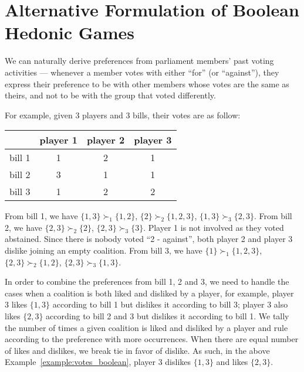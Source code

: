 
\chapter{Alternative Formulation of Boolean Hedonic Games}
\label{append:alternative_boolean}
\vspace*{2em}

We can naturally derive preferences from parliament members' past voting
activities --- whenever a member votes with either ``for'' (or ``against''), they
express their preference to be with other members whose votes are the same
as theirs, and not to be with the group that voted differently.

\begin{example}
\label{example:votes_boolean}
  For example, given 3 players and 3 bills, their votes are as follow:

  \begin{table}[h!]
  \centering
  \begin{tabular}{|c|c|c|c|}
  \hline
         & player 1 & player 2 & player 3 \\ \hline
  bill 1 & 1 & 2 & 1 \\
  bill 2 & 3 & 1 & 1 \\
  bill 3 & 1 & 2 & 2 \\
  \hline
  \end{tabular}
  \end{table}
\end{example}

From bill 1, we have $\{1, 3\} \succ_1 \{1, 2\}$, $\{2\} \succ_2 \{1, 2, 3\}$,
$\{1, 3\} \succ_3 \{2, 3\}$.
From bill 2, we have $\{2, 3\} \succ_2 \{2\}$, $\{2, 3\} \succ_3 \{3\}$.
Player 1 is not involved as they voted abstained.
Since there is nobody voted ``2 - against'', both player 2 and player 3 dislike
joining an empty coalition.
From bill 3, we have $\{1\} \succ_1 \{1, 2, 3\}$, $\{2, 3\} \succ_2 \{1, 2\}$,
$\{2, 3\} \succ_3 \{1, 3\}$.

In order to combine the preferences from bill 1, 2 and 3, we need to handle
the cases when a coalition is both liked and disliked by a player, for example,
player 3 likes $\{1, 3\}$ according to bill 1 but dislikes it according to bill 3;
player 3 also likes $\{2, 3\}$ according to bill 2 and 3 but dislikes it
according to bill 1.
We tally the number of times a given coalition is liked and disliked by a
player and rule according to the preference with more occurrences.
When there are equal number of likes and dislikes, we break tie in favor of dislike.
As such, in the above Example~\ref{example:votes_boolean}, player 3 dislikes
$\{1, 3\}$ and likes $\{2, 3\}$.

